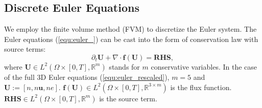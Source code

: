 \documentclass{article}
\begin{document}
\subsection{Discrete Euler Equations} \label{sec:discrete_euler}
We employ the finite volume method (FVM) to discretize the Euler system. The Euler equations (\ref{equ:euler_}) can be cast into the form of conservation law with source terms:
\begin{equation} \label{equ:euler_conservation}
    \partial_t \mathbf{U} + \nabla \cdot \mathbf{f}(\mathbf{U}) = \mathbf{RHS},
\end{equation}
where $\mathbf{U} \in L^2(\Omega \times [0,T], \mathbb{R}^m)$ stands for $m$ conservative variables. In the case of the full 3D Euler equations (\ref{equ:euler_rescaled}), $m = 5$ and $\mathbf{U} := [n, n\mathbf{u}, ne]$. $\mathbf{f}(\mathbf{U}) \in L^2(\Omega \times  [0,T], \mathbb{R}^{3 \times m})$ is the flux function. $\mathbf{RHS} \in L^2(\Omega \times  [0,T], \mathbb{R}^m)$ is the source term. 
\end{document}
